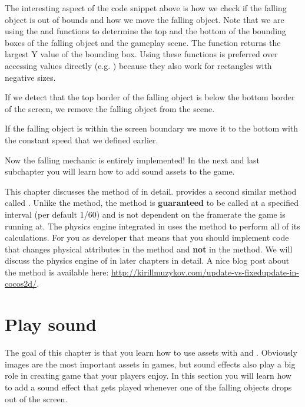 The interesting aspect of the code snippet above is how we check if the
falling object is out of bounds and how we move the falling object. Note that we
are using the  and 
functions to determine the top and the bottom of the bounding boxes of the
falling object and the gameplay scene. The  function
returns the largest Y value of the bounding box. Using these functions is preferred over accessing values
directly (e.g. ) because they
also work for rectangles with negative sizes.

If we detect that the top border of the falling object is below the bottom
border of the screen, we remove the falling object from the scene.

If the falling object is within the screen boundary we move it to the bottom
with the constant speed that we defined earlier.

Now the falling mechanic is entirely implemented! In the next and last
subchapter you will learn how to add sound assets to the game.

\begin{details}[frametitle={Update vs. Fixed Update}] 
This chapter discusses the  method of \cocos{} in detail.
\cocos{} provides a second similar method called
.
Unlike the  method, the  method is
\textbf{guaranteed} to be called at a specified interval (per default 1/60) and
is not dependent on the framerate the game is running at. The physics engine
integrated in \cocos{} uses the
 method to perform all of its calculations. For you as
developer that means that you should implement code that changes physical
attributes in the  method and \textbf{not} in the
 method. We will discuss the physics engine of \cocos{} in
later chapters in detail. A nice blog post about the 
method is available here:
\url{http://kirillmuzykov.com/update-vs-fixedupdate-in-cocos2d/}.
\end{details}

\section{Play sound}
The goal of this chapter is that you learn how to use assets with \SB{} and
\cocos{}. Obviously images are the most important assets in games, but sound
effects also play a big role in creating game that your players enjoy. In this
section you will learn how to add a sound effect that gets played whenever one
of the falling objects drops out of the screen.

